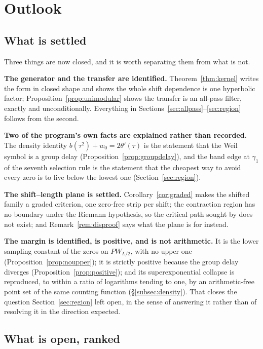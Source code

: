 \section{Outlook}\label{sec:outlook}

\subsection{What is settled}

Three things are now closed, and it is worth separating them from what is not.

\textbf{The generator and the transfer are identified.}
Theorem~\ref{thm:kernel} writes the form in closed shape and shows the whole
shift dependence is one hyperbolic factor; Proposition~\ref{prop:unimodular}
shows the transfer is an all-pass filter, exactly and unconditionally. Everything
in Sections~\ref{sec:allpass}--\ref{sec:region} follows from the second.

\textbf{Two of the program's own facts are explained rather than recorded.} The
density identity $b(\tau^2)+w_0=2\theta'(\tau)$ is the statement that the Weil
symbol is a group delay (Proposition~\ref{prop:groupdelay}), and the band edge at
$\gamma_1$ of the seventh selection rule is the statement that the cheapest way
to avoid every zero is to live below the lowest one (Section~\ref{sec:region}).

\textbf{The shift--length plane is settled.} Corollary~\ref{cor:graded} makes the
shifted family a graded criterion, one zero-free strip per shift; the contraction
region has no boundary under the Riemann hypothesis, so the critical path sought
by \cite{CriticalPath} does not exist; and Remark~\ref{rem:disproof} says what
the plane is for instead.

\textbf{The margin is identified, is positive, and is not arithmetic.} It is the
lower sampling constant of the zeros on $PW_{L/2}$, with no upper one
(Proposition~\ref{prop:noupper}); it is strictly positive because the group delay
diverges (Proposition~\ref{prop:positive}); and its superexponential collapse is
reproduced, to within a ratio of logarithms tending to one, by an arithmetic-free
point set of the same counting function (\S\ref{subsec:density}). That closes the
question Section~\ref{sec:region} left open, in the sense of answering it rather
than of resolving it in the direction expected.

\subsection{What is open, ranked}

